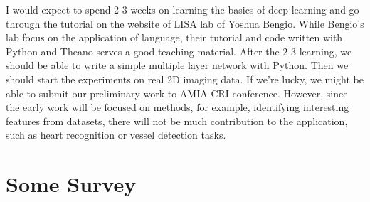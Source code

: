 \documentclass[12pt]{article}
\begin{document}
I would expect to spend 2-3 weeks on learning the basics of deep learning and
go through the tutorial on the website of LISA lab of Yoshua Bengio. While
Bengio's lab focus on the application of language, their tutorial and code
written with Python and Theano serves a good teaching material. After the 2-3
learning, we should be able to write a simple multiple layer network with
Python. Then we should start the experiments on real 2D imaging data. If we're
lucky, we might be able to submit our preliminary work to AMIA CRI
conference. However, since the early work will be focused on methods, for
example, identifying interesting features from datasets, there will not be
much contribution to the application, such as heart recognition or vessel
detection tasks. 
\section{Some Survey}
\end{document}
